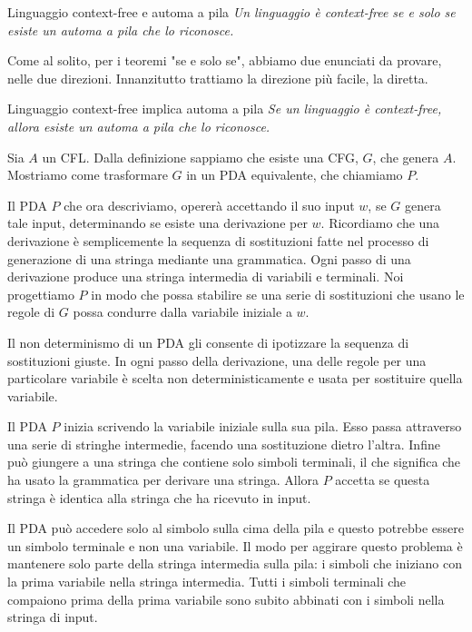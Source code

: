 \begin{Thm}{Linguaggio context-free e automa a pila}{}\label{thm:cfa-implica-pda}
\textit{Un linguaggio è context-free se e solo se esiste un automa a pila che lo riconosce.}    
\end{Thm}

Come al solito, per i teoremi "se e solo se", abbiamo due enunciati da provare, nelle due direzioni. Innanzitutto trattiamo la direzione più facile, la diretta.

\begin{Lemma}{Linguaggio context-free implica automa a pila}{}\label{lemma:cfa-implica-pda}
\textit{Se un linguaggio è context-free, allora esiste un automa a pila che lo riconosce.}

\begin{osservation}
Sia $A$ un CFL. Dalla definizione sappiamo che esiste una CFG, $G$, che genera $A$. Mostriamo come trasformare $G$ in un PDA equivalente, che chiamiamo $P$.

Il PDA $P$ che ora descriviamo, opererà accettando il suo input $w$, se $G$ genera tale input, determinando se esiste una derivazione per $w$. Ricordiamo che una derivazione è semplicemente la sequenza di sostituzioni fatte nel processo di generazione di una stringa mediante una grammatica. Ogni passo di una derivazione produce una stringa intermedia di variabili e terminali. Noi progettiamo $P$ in modo che possa stabilire se una serie di sostituzioni che usano le regole di $G$ possa condurre dalla variabile iniziale a $w$.

Il non determinismo di un PDA gli consente di ipotizzare la sequenza di sostituzioni giuste. In ogni passo della derivazione, una delle regole per una particolare variabile è scelta non deterministicamente e usata per sostituire quella variabile.

Il PDA $P$ inizia scrivendo la variabile iniziale sulla sua pila. Esso passa attraverso una serie di stringhe intermedie, facendo una sostituzione dietro l'altra. Infine può giungere a una stringa che contiene solo simboli terminali, il che significa che ha usato la grammatica per derivare una stringa. Allora $P$ accetta se questa stringa è identica alla stringa che ha ricevuto in input.%

Il PDA può accedere solo al simbolo sulla cima della pila e questo potrebbe essere un simbolo terminale e non una variabile. Il modo per aggirare questo problema è mantenere solo parte della stringa intermedia sulla pila: i simboli che iniziano con la prima variabile nella stringa intermedia. Tutti i simboli terminali che compaiono prima della prima variabile sono subito abbinati con i simboli nella stringa di input.


\end{osservation}
\end{Lemma}
